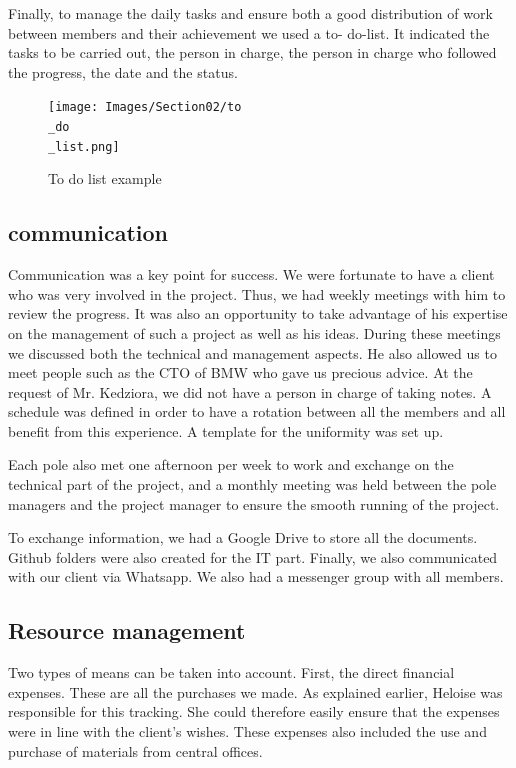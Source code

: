 \bigbreak
Finally, to manage the daily tasks and ensure both a good distribution of work between members and their achievement we used a to- do-list. It indicated the tasks to be carried out, the person in charge, the person in charge who followed the progress, the date and the status. 

\begin{figure}[ht]
    \centering
    \texttt{[image: Images/Section02/to\\\_do\\\_list.png]}
    \caption{To do list example}
    \label{fig:ToDoList}
\end{figure}

\subsection{communication}

Communication was a key point for success. We were fortunate to have a client who was very involved in the project. Thus, we had weekly meetings with him to review the progress. It was also an opportunity to take advantage of his expertise on the management of such a project as well as his ideas. During these meetings we discussed both the technical and management aspects. He also allowed us to meet people such as the CTO of BMW who gave us precious advice. At the request of Mr. Kedziora, we did not have a person in charge of taking notes. A schedule was defined in order to have a rotation between all the members and all benefit from this experience. A template for the uniformity was set up. 

\bigbreak
Each pole also met one afternoon per week to work and exchange on the technical part of the project, and a monthly meeting was held between the pole managers and the project manager to ensure the smooth running of the project. 

\bigbreak
To exchange information, we had a Google Drive to store all the documents. Github folders were also created for the IT part. Finally, we also communicated with our client via Whatsapp. We also had a messenger group with all members. 

\subsection{Resource management}

Two types of means can be taken into account. First, the direct financial expenses. These are all the purchases we made. As explained earlier, Heloise was responsible for this tracking. She could therefore easily ensure that the expenses were in line with the client's wishes. These expenses also included the use and purchase of materials from central offices. 


